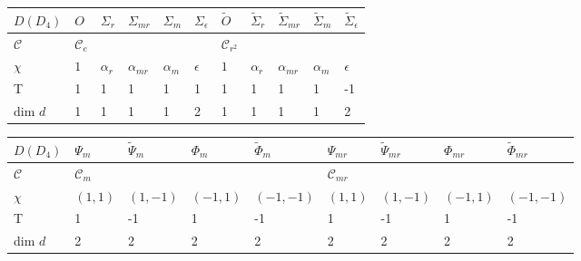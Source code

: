 \documentclass[two column]{article}
\begin{document}
\begin{table}
\centering
\begin{subtable}{\textwidth}
\raggedright
\begin{tabular}{l||lllll|lllll}

$D(D_4)$  & $O$     & $\Sigma_{r}$ & $\Sigma_{mr}$ & $\Sigma_{m}$ & $\Sigma_{\epsilon}$ & $\tilde{O}$ & $\tilde{\Sigma}_{r}$ & $\tilde{\Sigma}_{mr}$ & $\tilde{\Sigma}_{m}$ & $\tilde{\Sigma}_{\epsilon}$ 
\\ \hline
$\mathcal C$    & $\mathcal C_e$ &       &       &       &              &   $\mathcal C_{r^2}$     &           &       &           &                \\ $\chi$ & $1$ & $\alpha_{r}$ & $\alpha_{mr}$ & $\alpha_{m}$ & $\epsilon$          & $1$     & $\alpha_{r}$         & $\alpha_{mr}$         & $\alpha_{m}$         & $\epsilon$                  \\ 
\hline 
T & 1 & 1 & 1 & 1 & 1 & 1 & 1 & 1 & 1 & -1\\
dim $d$ & 1 & 1 & 1 & 1 & 2 & 1 & 1 & 1 & 1& 2
\end{tabular}
\end{subtable}

\vspace{0.5cm}
\medskip
\begin{subtable}{\textwidth}
\begin{tabular}{l||llll|llll}
$D(D_4)$  & $\Psi_{m}$ & $\tilde{\Psi}_{m}$ & $\Phi_{m}$ & $\tilde{\Phi}_{m}$ & $\Psi_{mr}$ & $\tilde{\Psi}_{mr}$ & $\Phi_{mr}$ & $\tilde{\Phi}_{mr}$ \\ \hline
$\mathcal C$    & $\mathcal C_m$    &          &    &            & $\mathcal C_{mr}$    &           &   &           \\ %
$\chi$ & $(1,1)$    & $(1,-1)$              & $(-1,1)$    & $(-1,-1)$              &$(1,1)$    & $(1,-1)$              & $(-1,1)$    & $(-1,-1)$             \\ \hline
T  & 1 & -1 & 1 & -1 & 1 & -1 & 1 & -1 \\
dim $d$ & 2 & 2 & 2 & 2 & 2 & 2 & 2 & 2 
\end{tabular}
\end{subtable}
\medskip


\end{table}
\end{document}
